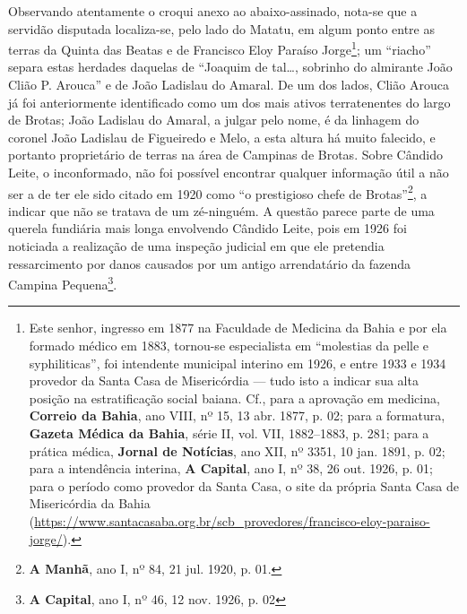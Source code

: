 Observando atentamente o croqui anexo ao abaixo-assinado, nota-se que a servidão disputada localiza-se, pelo lado do Matatu, em algum ponto entre as terras da Quinta das Beatas e de Francisco Eloy Paraíso Jorge\footnote{Este senhor, ingresso em 1877 na Faculdade de Medicina da Bahia e por ela formado médico em 1883, tornou-se especialista em ``molestias da pelle e syphiliticas'', foi intendente municipal interino em 1926, e entre 1933 e 1934 provedor da Santa Casa de Misericórdia --- tudo isto a indicar sua alta posição na estratificação social baiana. Cf., para a aprovação em medicina, \textbf{Correio da Bahia}, ano VIII, nº 15, 13 abr. 1877, p. 02; para a formatura, \textbf{Gazeta Médica da Bahia}, série II, vol. VII, 1882--1883, p. 281; para a prática médica, \textbf{Jornal de Notícias}, ano XII, nº 3351, 10 jan. 1891, p. 02; para a intendência interina, \textbf{A Capital}, ano I, nº 38, 26 out. 1926, p. 01; para o período como provedor da Santa Casa, o site da própria Santa Casa de Misericórdia da Bahia (\url{https://www.santacasaba.org.br/scb_provedores/francisco-eloy-paraiso-jorge/}).}; um ``riacho'' separa estas herdades daquelas de ``Joaquim de tal\dots, sobrinho do almirante João Clião P. Arouca'' e de João Ladislau do Amaral. De um dos lados, Clião Arouca já foi anteriormente identificado como um dos mais ativos terratenentes do largo de Brotas; João Ladislau do Amaral, a julgar pelo nome, é da linhagem do coronel João Ladislau de Figueiredo e Melo, a esta altura há muito falecido, e portanto proprietário de terras na área de Campinas de Brotas. Sobre Cândido Leite, o inconformado, não foi possível encontrar qualquer informação útil a não ser a de ter ele sido citado em 1920 como ``o prestigioso chefe de Brotas''\footnote{\textbf{A Manhã}, ano I, nº 84, 21 jul. 1920, p. 01.}, a indicar que não se tratava de um zé-ninguém. A questão parece parte de uma querela fundiária mais longa envolvendo Cândido Leite, pois em 1926 foi noticiada a realização de uma inspeção judicial em que ele pretendia ressarcimento por danos causados por um antigo arrendatário da fazenda Campina Pequena\footnote{\textbf{A Capital}, ano I, nº 46, 12 nov. 1926, p. 02}.

